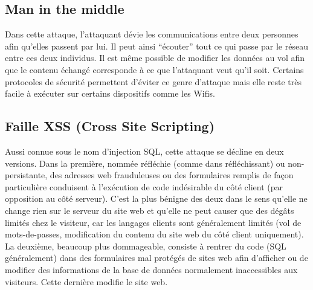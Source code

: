 \documentclass[article, french]{yReport}
\begin{document}
	\subsection{Man in the middle}
	Dans cette attaque, l'attaquant dévie les communications entre deux personnes afin qu'elles passent par lui. Il peut ainsi \enquote{écouter} tout ce qui passe par le réseau entre ces deux individus. Il est même possible de modifier les données au vol afin que le contenu échangé corresponde à ce que l'attaquant veut qu'il soit. Certains protocoles de sécurité permettent d'éviter ce genre d'attaque mais elle reste très facile à exécuter sur certains dispositifs comme les Wifis.
	
	\subsection{Faille XSS (Cross Site Scripting)}
	Aussi connue sous le nom d'injection SQL, cette attaque se décline en deux versions. Dans la première, nommée réfléchie (comme dans réfléchissant) ou non-persistante, des adresses web frauduleuses ou des formulaires remplis de façon particulière conduisent à l'exécution de code indésirable du côté client (par opposition au côté serveur). C'est la plus bénigne des deux dans le sens qu'elle ne change rien sur le serveur du site web et qu'elle ne peut causer que des dégâts limités chez le visiteur, car les langages clients sont généralement limités (vol de mots-de-passes, modification du contenu du site web du côté client uniquement). La deuxième, beaucoup plus dommageable, consiste à rentrer du code (SQL généralement) dans des formulaires mal protégés de sites web afin d'afficher ou de modifier des informations de la base de données normalement inaccessibles aux visiteurs. Cette dernière modifie le site web.
	
\end{document}
